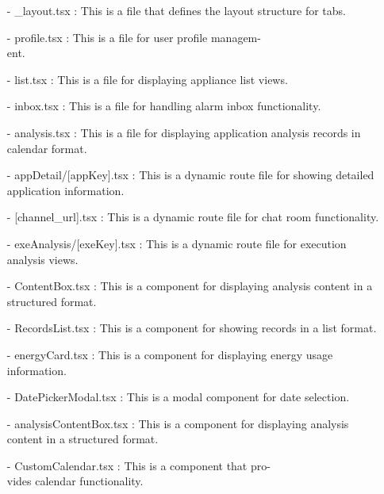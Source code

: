 \documentclass[conference]{IEEEtran}
\begin{document}
\begin{enumerate}
        \item[-] \_layout.tsx : This is a file that defines the layout structure for tabs. \\
        \item[-] profile.tsx : This is a file for user profile managem-\\ent.\\
        \item[-] list.tsx : This is a file for displaying appliance list views.\\
        \item[-] inbox.tsx : This is a file for handling alarm inbox functionality.\\
        \item[-] analysis.tsx : This is a file for displaying application analysis records in calendar format.\\

        \item[-] appDetail/[appKey].tsx : This is a dynamic route file for showing detailed application information.\\
        
        \item[-] [channel\_url].tsx : This is a dynamic route file for chat room functionality.\\
        
        \item[-] exeAnalysis/[exeKey].tsx : This is a dynamic route file for execution analysis views.\\
        \item[-] ContentBox.tsx : This is a component for displaying analysis content in a structured format.\\
        \item[-] RecordsList.tsx : This is a component for showing records in a list format.\\
        \item[-] energyCard.tsx : This is a component for displaying energy usage information. \\
        \item[-] DatePickerModal.tsx : This is a modal component for date selection.\\
        \item[-] analysisContentBox.tsx : This is a component for displaying analysis content in a structured format.\\
        \item[-] CustomCalendar.tsx : This is a component that pro-\\vides calendar functionality.\\
        

\end{enumerate}
\end{document}
